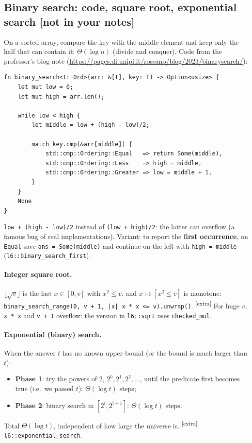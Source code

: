 \documentclass[11pt,a4paper]{article}
\theoremstyle{definition}\newtheorem*{definition}{Definition}
\newcommand{\notinnotes}{\textcolor{warn}{\textbf{[not in your notes]}}}
\newcommand{\extra}{\textsuperscript{\textcolor{warn}{[extra]}}}
\begin{document}
\subsection{Binary search: code, square root, exponential search \notinnotes}
On a sorted array, compare the key with the middle element and keep only the half that can contain it: $\Theta(\log n)$ (divide and conquer).
Code from the professor's blog note (\url{https://pages.di.unipi.it/rossano/blog/2023/binarysearch/}):
\begin{lstlisting}
fn binary_search<T: Ord>(arr: &[T], key: T) -> Option<usize> {
    let mut low = 0;
    let mut high = arr.len();

    while low < high {
        let middle = low + (high - low)/2;

        match key.cmp(&arr[middle]) {
            std::cmp::Ordering::Equal   => return Some(middle),
            std::cmp::Ordering::Less    => high = middle,
            std::cmp::Ordering::Greater => low = middle + 1,
        }
    }
    None
}
\end{lstlisting}
\noindent\texttt{low + (high - low)/2} instead of \texttt{(low + high)/2}: the latter can overflow (a famous bug of real implementations).
Variant: to report the \textbf{first occurrence}, on \texttt{Equal} save \texttt{ans = Some(middle)} and continue on the left with \texttt{high = middle}
(\texttt{l6::binary\_search\_first}).

\paragraph{Integer square root.} $\lfloor\sqrt v\rfloor$ is the last $x\in[0,v]$ with $x^2\le v$, and $x\mapsto [x^2\le v]$ is monotone:
\texttt{binary\_search\_range(0, v + 1, |x| x * x <= v).unwrap()}. \extra{} For huge $v$, \texttt{x * x} and \texttt{v + 1} overflow: the version in
\texttt{l6::sqrt} uses \texttt{checked\_mul}.

\paragraph{Exponential (binary) search.}
When the answer $t$ has no known upper bound (or the bound is much larger than $t$):
\begin{itemize}[nosep]
\item \textbf{Phase 1}: try the powers of 2, $2^0,2^1,2^2,\dots$, until the predicate first becomes true (i.e.\ we passed $t$): $\Theta(\log t)$ steps;
\item \textbf{Phase 2}: binary search in $[2^i,2^{i+1}]$: $\Theta(\log t)$ steps.
\end{itemize}
Total $\Theta(\log t)$, independent of how large the universe is. \extra{} \texttt{l6::exponential\_search}.
\end{document}

